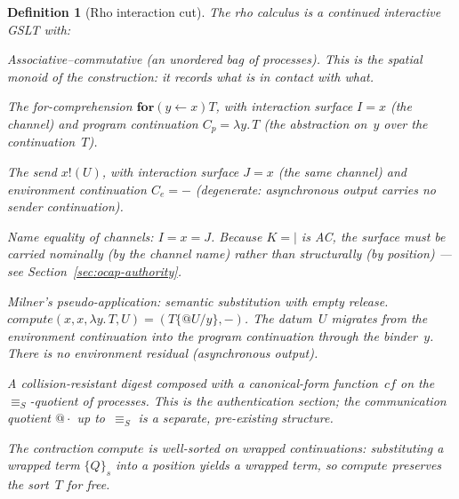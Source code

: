\documentclass[11pt,a4paper]{article}
\makeatletter
\newtheorem{definition}[theorem]{Definition}
\newcommand{\Par}{\mathbin{|}}
\newcommand{\forc}{\mathbf{for}}
\newcommand{\send}[2]{#1 !\!\left( #2 \right)}
\newcommand{\recv}[3]{\forc\!\left( #1 \leftarrow #2 \right) #3}
\newcommand{\quot}[1]{@#1}
\newcommand{\signed}[2]{\{#1\}_{#2}}
\newcommand{\hashf}{\texttt{\#}}
\newcommand{\Seq}{\equiv_{\!S}}
\makeatother
\begin{document}
\begin{definition}[Rho interaction cut]
  \label{def:rho-cut}
  The rho calculus is a continued interactive GSLT with:
  \begin{description}[style=nextline, leftmargin=2em, nosep]
    \item[Interaction constructor $K = \Par$.]
      Associative--commutative (an unordered bag of processes).
      This is the spatial monoid of the construction: it records
      what is in contact with what.
    \item[Program introduction $K_p = \forc$.]
      The for-comprehension $\recv{y}{x}{T}$, with interaction
      surface $I = x$ (the channel) and program continuation
      $C_p = \lambda y.\,T$ (the abstraction on~$y$ over the
      continuation~$T$).
    \item[Environment introduction $K_e = {!}$.]
      The send $\send{x}{U}$, with interaction surface
      $J = x$ (the same channel) and environment continuation
      $C_e = -$ (degenerate: asynchronous output carries no
      sender continuation).
    \item[Surface match: $\mathit{near}(I, J)$.]
      Name equality of channels: $I = x = J$.  Because $K = \Par$
      is AC, the surface must be carried nominally (by the
      channel name) rather than structurally (by position) ---
      see Section~\ref{sec:ocap-authority}.
    \item[Contraction: $\mathit{compute}$.]
      Milner's pseudo-application: semantic substitution with
      empty release.
      $\mathit{compute}(x, x, \lambda y.\,T, U) = (T\{\quot{U}/y\}, -)$.
      The datum~$U$ migrates from the environment continuation
      into the program continuation through the binder~$y$.
      There is no environment residual (asynchronous output).
    \item[Section: $\hashf = \mathit{digest} \circ \mathit{cf}$.]
      A collision-resistant digest composed with a canonical-form
      function~$\mathit{cf}$ on the $\Seq$-quotient of
      processes.  This is the authentication section; the
      communication quotient $\quot{\cdot}$ up to~$\Seq$ is a
      separate, pre-existing structure.
    \item[Wrappability.]
      The contraction $\mathit{compute}$ is well-sorted on
      wrapped continuations: substituting a wrapped term
      $\signed{Q}{s}$ into a position yields a wrapped term,
      so $\mathit{compute}$ preserves the sort~$T$ for free.
  \end{description}
\end{definition}
\end{document}
